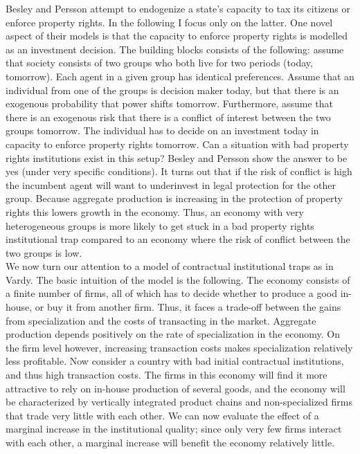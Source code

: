 \documentclass[12pt]{article}%
\begin{document}
Besley and Persson attempt to endogenize a state's capacity to tax its citizens or enforce property rights. In the following I focus only on the latter. One novel aspect of their models is that the capacity to enforce property rights is modelled as an investment decision. The building blocks consists of the following: assume that society consists of two groups who both live for two periods (today, tomorrow). Each agent in a given group has identical preferences. Assume that an individual from one of the groups is decision maker today, but that there is an exogenous probability that power shifts tomorrow. Furthermore, assume that there is an exogenous risk that there is a conflict of interest between the two groups tomorrow. The individual has to decide on an investment today in capacity to enforce property rights tomorrow. Can a situation with bad property rights institutions exist in this setup? Besley and Persson show the answer to be yes (under very specific conditions). It turns out that if the risk of conflict is high the incumbent agent will want to underinvest in legal protection for the other group. Because aggregate production is increasing in the protection of property rights this lowers growth in the economy. Thus, an economy with very heterogeneous groups is more likely to get stuck in a bad property rights institutional trap compared to an economy where the risk of conflict between the two groups is low. \\

We now turn our attention to a model of contractual institutional traps as in Vardy. The basic intuition of the model is the following. The economy consists of a finite number of firms, all of which has to decide whether to produce a good in-house, or buy it from another firm. Thus, it faces a trade-off between the gains from specialization and the costs of transacting in the market. Aggregate production depends positively on the rate of specialization in the economy. On the firm level however, increasing transaction costs makes specialization relatively less profitable. Now consider a country with bad initial contractual institutions, and thus high transaction costs. The firms in this economy will find it more attractive to rely on in-house production of several goods, and the economy will be characterized  by vertically integrated product chains and non-specialized firms that trade very little with each other. We can now evaluate the effect of a marginal increase in the institutional quality; since only very few firms interact with each other, a marginal increase will benefit the economy relatively little. 
\end{document}
